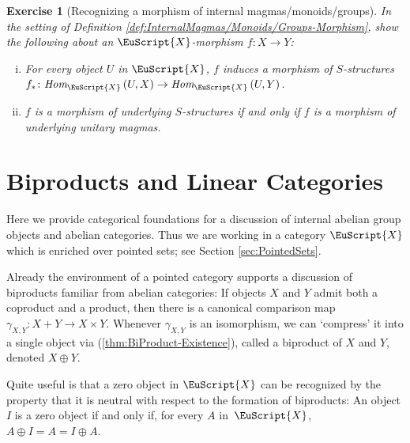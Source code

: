 \documentclass [12pt,oneside]{book}%
\theoremstyle{captionstyle}  %
\newtheorem{exercise}[theorem]{Exercise}
\newenvironment{exercises}{%
	\def\FrameCommand{{\color{Maroon}\vrule width 0pt}\hspace{0pt}\fboxsep=\FrameSep}%
	\MakeFramed{\hsize=0.95\linewidth\advance\hsize-\width\FrameRestore%
		\bigskip
		\textbf{Exercises}\vspace{-2ex}\footnotesize{
		}}
}
{\endMakeFramed}
\newcommand{\from}{\colon}				%
\newcommand{\HomIn}[3]{\textit{Hom}_{#1}\left(#2,#3\right)}
\newcommand{\Ctgry}[1]{\EuScript{#1}}					%
\newcommand{\Prdct}[2]{#1 \times #2}	 	%
\newcommand{\CoPrdct}[2]{#1 + #2}					%
\newcommand{\BiPrdct}[2]{#1\oplus #2}
\newcommand{\SumProdComp}[2]{\gamma_{#1,#2}}			%
\begin{document}
\begin{exercises}


\begin{exercise}[Recognizing a morphism of internal magmas/monoids/groups]
    \label{exe:InternalMagmas/Monoids/Groups-MorphismRecognize}
    In the setting of Definition \ref{def:InternalMagmas/Monoids/Groups-Morphism}, show the following about an $\Ctgry{X} $-morphism $f\from X\to Y$:
    \begin{enumerate}[(i)]
        \item For every object $U$ in $\Ctgry{X} $, $f$ induces a morphism of $S$-structures $f_{\ast}\from \HomIn{\Ctgry{X} }{U}{X}\to \HomIn{\Ctgry{X}}{U}{Y}$.
        \item $f$ is a morphism of underlying $S$-structures if and only if $f$ is a morphism of underlying unitary magmas.
    \end{enumerate}
\end{exercise}
\end{exercises}


\newpage

\section{Biproducts and Linear Categories}
\label{sec:BiProducts}

Here we provide categorical foundations for a discussion of internal abelian group objects and abelian categories.  Thus we are working in a category $\Ctgry{X}$ which is enriched over pointed sets; see Section \ref{sec:PointedSets}.

Already the environment of a pointed category supports a discussion of biproducts familiar from abelian categories: If objects $X$ and $Y$ admit both a coproduct and a product, then there is a canonical comparison map $\SumProdComp{X}{Y}\from \CoPrdct{X}{Y}\to \Prdct{X}{Y}$. Whenever $\SumProdComp{X}{Y}$ is an isomorphism, we can `compress' it into a single object via (\ref{thm:BiProduct-Existence}), called a biproduct of $X$ and $Y$, denoted $\BiPrdct{X}{Y}$.

Quite useful is that a zero object in $\Ctgry{X}$ can be recognized by the property that it is neutral with respect to the formation of biproducts: An object $I$ is a zero object if and only if, for every $A$ in~$\Ctgry{X}$, $\BiPrdct{A}{I}=A=\BiPrdct{I}{A}$.
\end{document}
